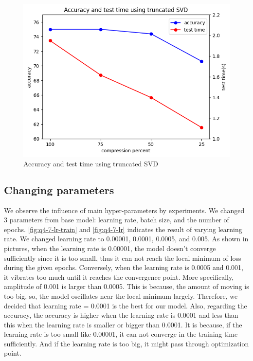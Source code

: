 \begin{figure}[htbp]
	\centering
	\includegraphics[width=0.5\linewidth]{image/q4-6-svd.png}
	\caption{Accuracy and test time using truncated SVD}
	\label{fig:cnn_svd}
\end{figure}

\subsection{Changing parameters}
We observe the influence of main hyper-parameters by experiments. We changed 3 parameters from base model: learning rate, batch size, and the number of epochs. \cref{fig:q4-7-lr-train} and \cref{fig:q4-7-lr} indicates the result of varying learning rate. We changed learning rate to 0.00001, 0.0001, 0.0005, and 0.005. As shown in pictures, when the learning rate is 0.00001, the model doesn't converge sufficiently since it is too small, thus it can not reach the local minimum of loss during the given epochs. Conversely, when the learning rate is 0.0005 and 0.001, it vibrates too much until it reaches the convergence point. More specifically, amplitude of 0.001 is larger than 0.0005. This is because, the amount of moving is too big, so, the model oscillates near the local minimum largely. Therefore, we decided that learning rate = 0.0001 is the best for our model. Also, regarding the accuracy, the accuracy is higher when the learning rate is 0.0001 and less than this when the learning rate is smaller or bigger than 0.0001. It is because, if the learning rate is too small like 0.00001, it can not converge in the training time sufficiently. And if the learning rate is too big, it might pass through optimization point.

